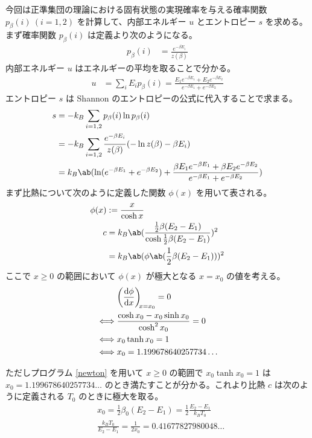 \documentclass[a4paper,11pt]{jlreq}
\begin{document}
今回は正準集団の理論における固有状態の実現確率を与える確率関数 $p_\beta(i)\ (i = 1, 2)$ を計算して、内部エネルギー $u$ とエントロピー $s$ を求める。
まず確率関数 $p_\beta(i)$ は定義より次のようになる。
\begin{align}
  p_\beta(i) & = \frac{e^{-\beta E_i}}{z(\beta)}
\end{align}
内部エネルギー $u$ はエネルギーの平均を取ることで分かる。
\begin{align}
  u & = \sum_i E_ip_\beta(i) = \frac{E_1e^{-\beta E_1} + E_2e^{-\beta E_2}}{e^{-\beta E_1} + e^{-\beta E_2}}
\end{align}
エントロピー $s$ は Shannon のエントロピーの公式に代入することで求まる。
\begin{align}
  s & = -k_B\sum_{i = 1,2}p_\beta(i)\ln p_\beta(i)                                                                                               \\
    & = -k_B\sum_{i = 1,2}\frac{e^{-\beta E_i}}{z(\beta)}(- \ln z(\beta) - \beta E_i)                                                            \\
    & = k_B\ab(\ln(e^{-\beta E_1} + e^{-\beta E_2}) + \frac{\beta E_1e^{-\beta E_1} + \beta E_2e^{-\beta E_2}}{e^{-\beta E_1} + e^{-\beta E_2}})
\end{align}
まず比熱について次のように定義した関数 $\phi(x)$ を用いて表される。
\begin{align}
  \phi(x) & := \frac{x}{\cosh x}                                                             \\
  c       & = k_B\ab(\frac{\frac{1}{2}\beta(E_2 - E_1)}{\cosh\frac{1}{2}\beta(E_2 - E_1)})^2 \\
          & = k_B\ab(\phi\ab(\frac{1}{2}\beta(E_2 - E_1)))^2
\end{align}
ここで $x\geq 0$ の範囲において $\phi(x)$ が極大となる $x = x_0$ の値を考える。
\begin{align}
       & \diff{\phi}{x}[x = x_0] = 0                      \\
  \iff & \frac{\cosh x_0 - x_0\sinh x_0}{\cosh^2 x_0} = 0 \\
  \iff & x_0\tanh x_0 = 1                                 \\
  \iff & x_0 = 1.199678640257734\ldots
\end{align}

ただしプログラム \ref{newton} を用いて $x\geq 0$ の範囲で $x_0\tanh x_0 = 1$ は $x_0 = 1.199678640257734\ldots$ のとき満たすことが分かる。これより比熱 $c$ は次のように定義される $T_0$ のときに極大を取る。
\begin{align}
   & x_0 = \frac{1}{2}\beta_0(E_2 - E_1) = \frac{1}{2}\frac{E_2 - E_1}{k_BT_0} \\
   & \frac{k_BT_0}{E_2 - E_1} = \frac{1}{2x_0} =  0.41677827980048\ldots
\end{align}
\end{document}
